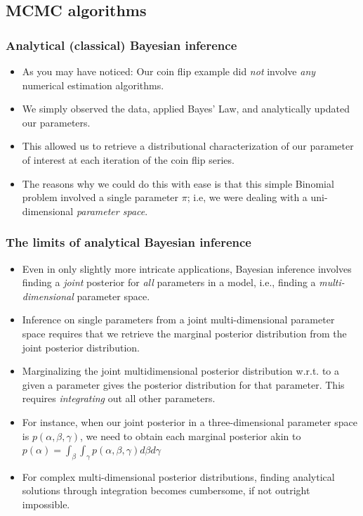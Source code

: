 \documentclass[
  11pt,
]{article}
\providecommand{\tightlist}{%
  \setlength{\itemsep}{0pt}\setlength{\parskip}{0pt}}
\begin{document}
\hypertarget{mcmc-algorithms}{%
\subsection{MCMC algorithms}\label{mcmc-algorithms}}

\hypertarget{analytical-classical-bayesian-inference}{%
\subsubsection{Analytical (classical) Bayesian inference}\label{analytical-classical-bayesian-inference}}

\begin{itemize}
\tightlist
\item
  As you may have noticed: Our coin flip example did \emph{not} involve \emph{any} numerical estimation algorithms.
\item
  We simply observed the data, applied Bayes' Law, and analytically updated our parameters.
\item
  This allowed us to retrieve a distributional characterization of our parameter of interest at each iteration of the coin flip series.
\item
  The reasons why we could do this with ease is that this simple Binomial problem involved a single parameter \(\pi\); i.e, we were dealing with a uni-dimensional \emph{parameter space}.
\end{itemize}

\hypertarget{the-limits-of-analytical-bayesian-inference}{%
\subsubsection{The limits of analytical Bayesian inference}\label{the-limits-of-analytical-bayesian-inference}}

\begin{itemize}
\tightlist
\item
  Even in only slightly more intricate applications, Bayesian inference involves finding a \emph{joint} posterior for \emph{all} parameters in a model, i.e., finding a \emph{multi-dimensional} parameter space.
\item
  Inference on single parameters from a joint multi-dimensional parameter space requires that we retrieve the marginal posterior distribution from the joint posterior distribution.
\item
  Marginalizing the joint multidimensional posterior distribution w.r.t. to a given a parameter gives the posterior distribution for that parameter. This requires \emph{integrating} out all other parameters.
\item
  For instance, when our joint posterior in a three-dimensional parameter space is \(p(\alpha,\beta, \gamma)\), we need to obtain each marginal posterior akin to \(p(\alpha) = \int_{\beta} \int_{\gamma} p(\alpha,\beta, \gamma) d\beta d\gamma\)
\item
  For complex multi-dimensional posterior distributions, finding analytical solutions through integration becomes cumbersome, if not outright impossible.
\end{itemize}
\end{document}
